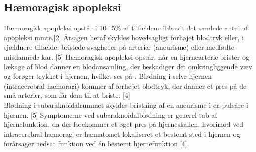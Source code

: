 \subsection{Hæmoragisk apopleksi}
Hæmoragisk apopleksi opstår i 10-15\% af tilfældene iblandt det samlede antal af apopleksi ramte.[2] Årsagen heraf skyldes hovedsagligt forhøjet blodtryk eller, i sjældnere tilfælde, bristede svagheder på arterier (aneurisme) eller medfødte misdannede kar. [5] Hæmoragisk apopleksi opstår, når en hjernearterie brister og lækage af blod danner en blodansamling, der beskadiger det omkringliggende væv og forøger trykket i hjernen, hvilket ses på . Blødning i selve hjernen (intracerebral hæmoragi) kommer af forhøjet blodtryk, der danner et pres på de små arterier, som får dem til at briste. [4] \\
Blødning i subaraknoidalrummet skyldes bristning af en aneurisme i en pulsåre i hjernen. [5] Symptomerne ved subaraknoidalblødning er generel tab af hjernefunktion, da der forekommer et øget pres på hjerneskallen, hvorimod ved intracerebral hæmoragi er hæmatomet lokaliseret et bestemt sted i hjernen og forårsager nedsat funktion ved én bestemt hjernefunktion [4]. 









